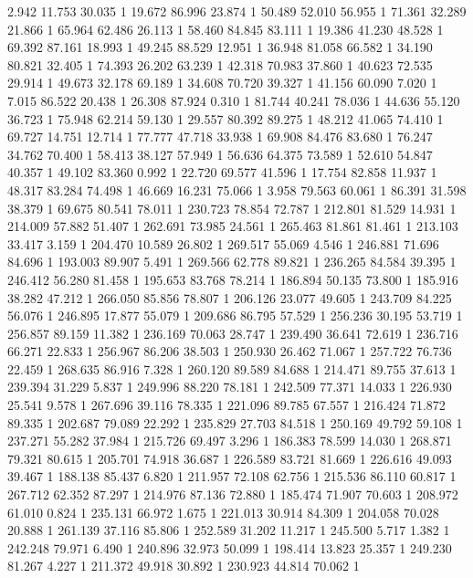 	2.942	11.753	30.035	1
	19.672	86.996	23.874	1
	50.489	52.010	56.955	1
	71.361	32.289	21.866	1
	65.964	62.486	26.113	1
	58.460	84.845	83.111	1
	19.386	41.230	48.528	1
	69.392	87.161	18.993	1
	49.245	88.529	12.951	1
	36.948	81.058	66.582	1
	34.190	80.821	32.405	1
	74.393	26.202	63.239	1
	42.318	70.983	37.860	1
	40.623	72.535	29.914	1
	49.673	32.178	69.189	1
	34.608	70.720	39.327	1
	41.156	60.090	7.020	1
	7.015	86.522	20.438	1
	26.308	87.924	0.310	1
	81.744	40.241	78.036	1
	44.636	55.120	36.723	1
	75.948	62.214	59.130	1
	29.557	80.392	89.275	1
	48.212	41.065	74.410	1
	69.727	14.751	12.714	1
	77.777	47.718	33.938	1
	69.908	84.476	83.680	1
	76.247	34.762	70.400	1
	58.413	38.127	57.949	1
	56.636	64.375	73.589	1
	52.610	54.847	40.357	1
	49.102	83.360	0.992	1
	22.720	69.577	41.596	1
	17.754	82.858	11.937	1
	48.317	83.284	74.498	1
	46.669	16.231	75.066	1
	3.958	79.563	60.061	1
	86.391	31.598	38.379	1
	69.675	80.541	78.011	1
	230.723	78.854	72.787	1
	212.801	81.529	14.931	1
	214.009	57.882	51.407	1
	262.691	73.985	24.561	1
	265.463	81.861	81.461	1
	213.103	33.417	3.159	1
	204.470	10.589	26.802	1
	269.517	55.069	4.546	1
	246.881	71.696	84.696	1
	193.003	89.907	5.491	1
	269.566	62.778	89.821	1
	236.265	84.584	39.395	1
	246.412	56.280	81.458	1
	195.653	83.768	78.214	1
	186.894	50.135	73.800	1
	185.916	38.282	47.212	1
	266.050	85.856	78.807	1
	206.126	23.077	49.605	1
	243.709	84.225	56.076	1
	246.895	17.877	55.079	1
	209.686	86.795	57.529	1
	256.236	30.195	53.719	1
	256.857	89.159	11.382	1
	236.169	70.063	28.747	1
	239.490	36.641	72.619	1
	236.716	66.271	22.833	1
	256.967	86.206	38.503	1
	250.930	26.462	71.067	1
	257.722	76.736	22.459	1
	268.635	86.916	7.328	1
	260.120	89.589	84.688	1
	214.471	89.755	37.613	1
	239.394	31.229	5.837	1
	249.996	88.220	78.181	1
	242.509	77.371	14.033	1
	226.930	25.541	9.578	1
	267.696	39.116	78.335	1
	221.096	89.785	67.557	1
	216.424	71.872	89.335	1
	202.687	79.089	22.292	1
	235.829	27.703	84.518	1
	250.169	49.792	59.108	1
	237.271	55.282	37.984	1
	215.726	69.497	3.296	1
	186.383	78.599	14.030	1
	268.871	79.321	80.615	1
	205.701	74.918	36.687	1
	226.589	83.721	81.669	1
	226.616	49.093	39.467	1
	188.138	85.437	6.820	1
	211.957	72.108	62.756	1
	215.536	86.110	60.817	1
	267.712	62.352	87.297	1
	214.976	87.136	72.880	1
	185.474	71.907	70.603	1
	208.972	61.010	0.824	1
	235.131	66.972	1.675	1
	221.013	30.914	84.309	1
	204.058	70.028	20.888	1
	261.139	37.116	85.806	1
	252.589	31.202	11.217	1
	245.500	5.717	1.382	1
	242.248	79.971	6.490	1
	240.896	32.973	50.099	1
	198.414	13.823	25.357	1
	249.230	81.267	4.227	1
	211.372	49.918	30.892	1
	230.923	44.814	70.062	1

